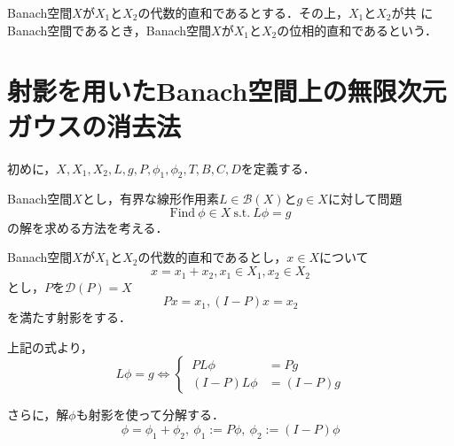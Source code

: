 \begin{dfn}[位相的直和]
  Banach空間$X$が$X_1$と$X_2$の代数的直和であるとする．その上，$X_1$と$X_2$が共 にBanach空間であるとき，Banach空間$X$が$X_1$と$X_2$の位相的直和であるという．
\end{dfn}

\section{射影を用いたBanach空間上の無限次元ガウスの消去法}
\label{sct:無限次元ガウスの消去法}

  初めに，$X,X_1,X_2,L,g,P,\phi_1,\phi_2,T,B,C,D$を定義する．

  Banach空間$X$とし，有界な線形作用素$L \in \mathcal{B}(X)$と$g\in X$に対して問題
  \begin{equation*}
    \text{Find}\ \phi \in X \ \text{s.t.}\ L\phi = g
  \end{equation*}
  の解を求める方法を考える．

  Banach空間$X$が$X_1$と$X_2$の代数的直和であるとし，$x \in X$について
  \begin{equation*}
    x=x_1+x_2, x_1 \in X_1, x_2 \in X_2
  \end{equation*}
  とし，$P$を$\mathcal{D}(P)=X$
  \begin{equation*}
    Px=x_1, (I-P)x=x_2
  \end{equation*}
  を満たす射影をする．

  上記の式より，
  \begin{equation*}
    L \phi = g \Leftrightarrow
    \left\{ \,
    \begin{aligned}
      PL\phi &= Pg \\
      (I-P)L\phi &= (I-P)g
    \end{aligned}
    \right.
  \end{equation*}

  さらに，解$\phi$も射影を使って分解する．
  \begin{equation*}
    \phi = \phi_1 + \phi_2,\ \phi_1:=P\phi,\ \phi_2:=(I-P)\phi
  \end{equation*}

